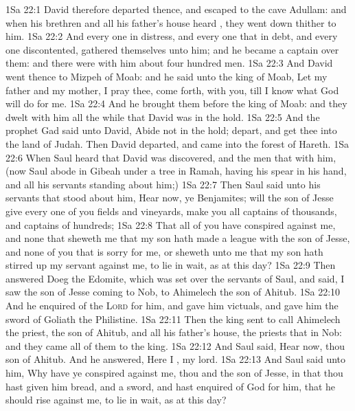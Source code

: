 \vs 1Sa 22:1 David therefore departed thence, and escaped to the cave Adullam: and when his brethren and all his father's house heard , they went down thither to him.
\vs 1Sa 22:2 And every one  in distress, and every one that  in debt, and every one  discontented, gathered themselves unto him; and he became a captain over them: and there were with him about four hundred men.
\vs 1Sa 22:3 And David went thence to Mizpeh of Moab: and he said unto the king of Moab, Let my father and my mother, I pray thee, come forth,  with you, till I know what God will do for me.
\vs 1Sa 22:4 And he brought them before the king of Moab: and they dwelt with him all the while that David was in the hold.
\vs 1Sa 22:5 And the prophet Gad said unto David, Abide not in the hold; depart, and get thee into the land of Judah. Then David departed, and came into the forest of Hareth.
\vs 1Sa 22:6 When Saul heard that David was discovered, and the men that  with him, (now Saul abode in Gibeah under a tree in Ramah, having his spear in his hand, and all his servants  standing about him;)
\vs 1Sa 22:7 Then Saul said unto his servants that stood about him, Hear now, ye Benjamites; will the son of Jesse give every one of you fields and vineyards,  make you all captains of thousands, and captains of hundreds;
\vs 1Sa 22:8 That all of you have conspired against me, and  none that sheweth me that my son hath made a league with the son of Jesse, and  none of you that is sorry for me, or sheweth unto me that my son hath stirred up my servant against me, to lie in wait, as at this day?
\vs 1Sa 22:9 Then answered Doeg the Edomite, which was set over the servants of Saul, and said, I saw the son of Jesse coming to Nob, to Ahimelech the son of Ahitub.
\vs 1Sa 22:10 And he enquired of the \textsc{Lord} for him, and gave him victuals, and gave him the sword of Goliath the Philistine.
\vs 1Sa 22:11 Then the king sent to call Ahimelech the priest, the son of Ahitub, and all his father's house, the priests that  in Nob: and they came all of them to the king.
\vs 1Sa 22:12 And Saul said, Hear now, thou son of Ahitub. And he answered, Here I , my lord.
\vs 1Sa 22:13 And Saul said unto him, Why have ye conspired against me, thou and the son of Jesse, in that thou hast given him bread, and a sword, and hast enquired of God for him, that he should rise against me, to lie in wait, as at this day?
